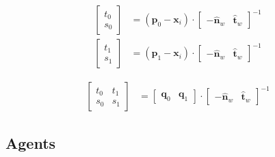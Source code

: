 \begin{align}
\begin{bmatrix} t_{0} \\ s_{0} \end{bmatrix} &= (\mathbf{p}_{0} - \mathbf{x}_{i}) \cdot \begin{bmatrix} -\hat{\mathbf{n}}_{w} & \hat{\mathbf{t}}_{w} \end{bmatrix}^{-1} \\
\begin{bmatrix} t_{1} \\ s_{1} \end{bmatrix} &= (\mathbf{p}_{1} - \mathbf{x}_{i}) \cdot \begin{bmatrix} -\hat{\mathbf{n}}_{w} & \hat{\mathbf{t}}_{w} \end{bmatrix}^{-1}
\end{align}

\begin{align}
\begin{bmatrix} t_{0} & t_{1} \\ s_{0} & s_{1} \end{bmatrix} &= \begin{bmatrix} \mathbf{q}_{0} & \mathbf{q}_{1} \end{bmatrix} \cdot \begin{bmatrix} -\hat{\mathbf{n}}_{w} & \hat{\mathbf{t}}_{w} \end{bmatrix}^{-1}
\end{align}



\subsection{Agents}

